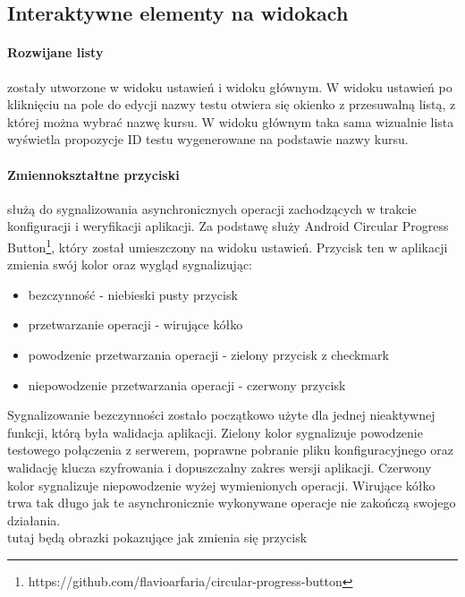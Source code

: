 \documentclass{report}
\begin{document}
		\subsection{Interaktywne elementy na widokach}
		
		\paragraph{Rozwijane listy}
		zostały utworzone w widoku ustawień i widoku głównym. W widoku ustawień po kliknięciu na pole do edycji nazwy testu otwiera się okienko z przesuwalną listą, z której można wybrać nazwę kursu. W widoku głównym taka sama wizualnie lista wyświetla propozycje ID testu wygenerowane na podstawie nazwy kursu.
		
		\paragraph{Zmiennokształtne przyciski}
		służą do sygnalizowania asynchronicznych operacji zachodzących w trakcie konfiguracji i weryfikacji aplikacji. Za podstawę służy Android Circular Progress Button\footnote{https://github.com/flavioarfaria/circular-progress-button}, który został umieszczony na widoku ustawień. Przycisk ten w aplikacji zmienia swój kolor oraz wygląd sygnalizując:
		\begin{itemize}
			\item bezczynność - niebieski pusty przycisk
			\item przetwarzanie operacji - wirujące kółko
			\item powodzenie przetwarzania operacji - zielony przycisk z checkmark
			\item niepowodzenie przetwarzania operacji - czerwony przycisk 
		\end{itemize}
		Sygnalizowanie bezczynności zostało początkowo użyte dla jednej nieaktywnej funkcji, którą była walidacja aplikacji. Zielony kolor sygnalizuje powodzenie testowego połączenia z serwerem, poprawne pobranie pliku konfiguracyjnego oraz walidację klucza szyfrowania i dopuszczalny zakres wersji aplikacji.
		Czerwony kolor sygnalizuje niepowodzenie wyżej wymienionych operacji.
		Wirujące kółko trwa tak długo jak te asynchronicznie wykonywane operacje nie zakończą swojego działania.\\
		
		tutaj będą obrazki pokazujące jak zmienia się przycisk\\
		
\end{document}
